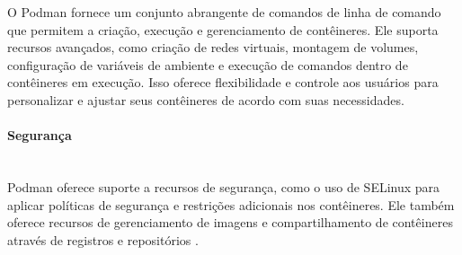 O Podman fornece um conjunto abrangente de comandos de linha de comando que permitem a criação, execução e gerenciamento de contêineres. Ele suporta recursos avançados, como criação de redes virtuais, montagem de volumes, configuração de variáveis de ambiente e execução de comandos dentro de contêineres em execução. Isso oferece flexibilidade e controle aos usuários para personalizar e ajustar seus contêineres de acordo com suas necessidades.

\paragraph*{Segurança}\mbox{}\\

 Podman oferece suporte a recursos de segurança, como o uso de SELinux para aplicar políticas de segurança e restrições adicionais nos contêineres. Ele também oferece recursos de gerenciamento de imagens e compartilhamento de contêineres através de registros e repositórios \cite{podman-docs, what-is-podman}.